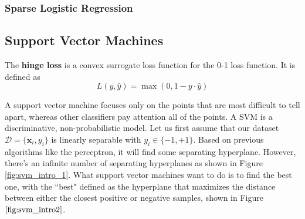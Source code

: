 \documentclass{article}
\begin{document}
    \subsubsection{Sparse Logistic Regression}

  \subsection{Support Vector Machines}

    \begin{definition}
      The \textbf{hinge loss} is a convex surrogate loss function for the 0-1 loss function. It is defined as 
      \begin{equation}
        L(y, \hat{y}) = \max(0, 1 - y \cdot \hat{y})
      \end{equation}
    \end{definition}

    A support vector machine focuses only on the points that are most difficult to tell apart, whereas other classifiers pay attention all of the points. A SVM is a discriminative, non-probabilistic model. Let us first assume that our dataset $\mathcal{D} = \{\mathbf{x}_i, y_i\}$ is linearly separable with $y_i \in \{-1, +1\}$. Based on previous algorithms like the perceptron, it will find some separating hyperplane. However, there's an infinite number of separating hyperplanes as shown in Figure \ref{fig:svm_intro_1}. What support vector machines want to do is to find the best one, with the ``best" defined as the hyperplane that maximizes the distance between either the closest positive or negative samples, shown in Figure $\ref{fig:svm_intro2}$.  
\end{document}
